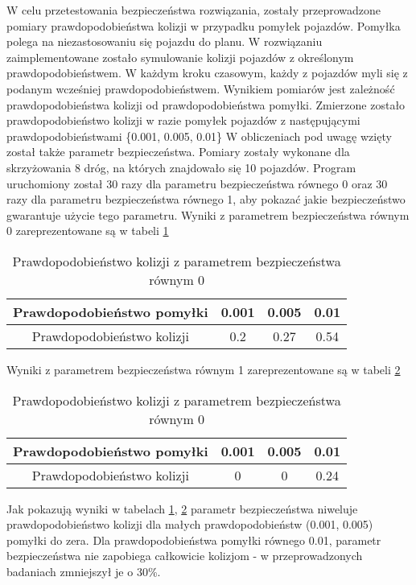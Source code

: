W celu przetestowania bezpieczeństwa rozwiązania, zostały przeprowadzone pomiary prawdopodobieństwa kolizji w przypadku pomyłek pojazdów. Pomyłka polega na niezastosowaniu się pojazdu do planu. W rozwiązaniu zaimplementowane zostało symulowanie kolizji pojazdów z określonym prawdopodobieństwem. W każdym kroku czasowym, każdy z pojazdów myli się z podanym wcześniej prawdopodobieństwem. Wynikiem pomiarów jest zależność prawdopodobieństwa kolizji od prawdopodobieństwa pomyłki. Zmierzone zostało prawdopodobieństwo kolizji w razie pomyłek pojazdów z następującymi prawdopodobieństwami \{0.001, 0.005, 0.01\}
\newline
\indent
W obliczeniach pod uwagę wzięty został także parametr bezpieczeństwa. Pomiary zostały wykonane dla skrzyżowania 8 dróg, na których znajdowało się 10 pojazdów. Program uruchomiony został 30 razy dla parametru bezpieczeństwa równego 0 oraz 30 razy dla parametru bezpieczeństwa równego 1, aby pokazać jakie bezpieczeństwo gwarantuje użycie tego parametru.
\newline
\newline
Wyniki z parametrem bezpieczeństwa równym 0 zareprezentowane są w tabeli \ref{firstCollision}
\begin{table}[H]
    \centering
    \begin{tabular}{|c|c|c|c|}
      \hline 
      Prawdopodobieństwo pomyłki & 0.001 & 0.005 & 0.01 \\
      \hline
      Prawdopodobieństwo kolizji & 0.2 & 0.27 & 0.54 \\
      \hline
    \end{tabular} 
    \caption{Prawdopodobieństwo kolizji z parametrem bezpieczeństwa równym 0}
    \label{firstCollision}
\end{table}
\noindent
Wyniki z parametrem bezpieczeństwa równym 1 zareprezentowane są w tabeli \ref{secondCollision}
\begin{table}[H]
    \centering
    \begin{tabular}{|c|c|c|c|}
      \hline 
      Prawdopodobieństwo pomyłki & 0.001 & 0.005 & 0.01 \\
      \hline
      Prawdopodobieństwo kolizji & 0 & 0 & 0.24 \\
      \hline
    \end{tabular} 
    \caption{Prawdopodobieństwo kolizji z parametrem bezpieczeństwa równym 0}
    \label{secondCollision}
\end{table}
Jak pokazują wyniki w tabelach \ref{firstCollision}, \ref{secondCollision} parametr bezpieczeństwa niweluje prawdopodobieństwo kolizji dla małych prawdopodobieństw (0.001, 0.005) pomyłki do zera. Dla prawdopodobieństwa pomyłki równego 0.01, parametr bezpieczeństwa nie zapobiega całkowicie kolizjom - w przeprowadzonych badaniach zmniejszył je o 30\%.

